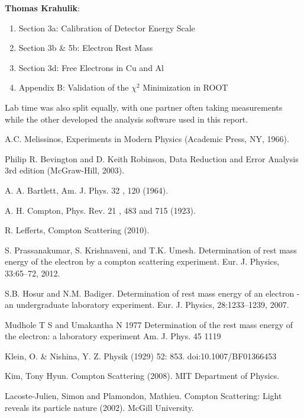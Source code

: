 \documentclass[%
 reprint,
 amsmath,amssymb,
 aps,
 pra,
]{revtex4-1}
\begin{document}
\noindent \textbf{Thomas Krahulik}:
\begin{enumerate}
	\item Section 3a: Calibration of Detector Energy Scale
	\item Section 3b \& 5b: Electron Rest Mass
	\item Section 3d: Free Electrons in Cu and Al
	\item Appendix B: Validation of the $\chi^2$ Minimization in ROOT
\end{enumerate}

\noindent Lab time was also split equally, with one partner often taking measurements while the other developed the analysis software used in this report.

\begin{thebibliography}{6}
	
	A.C. Melissinos, Experiments in Modern Physics (Academic Press, NY, 1966).
	
	Philip R. Bevington and D. Keith Robinson, Data Reduction and Error Analysis 3rd edition (McGraw-Hill, 2003).

	A. A. Bartlett, Am. J. Phys. 32 , 120 (1964).
	
	A. H. Compton, Phys. Rev. 21 , 483 and 715 (1923).
	
	R. Lefferts, Compton Scattering (2010).
	
	 S. Prassanakumar, S. Krishnaveni, and T.K. Umesh. Determination of rest mass energy of the electron by a compton scattering experiment. Eur. J. Physics, 33:65–72, 2012.
	 
	S.B. Hosur and N.M. Badiger. Determination of rest mass energy of an electron - an undergraduate laboratory experiment. Eur. J. Physics, 28:1233–1239, 2007.
	
	Mudhole T S and Umakantha N 1977 Determination of the rest mass energy of the electron: a laboratory experiment Am. J. Phys. 45 1119
	
	Klein, O. \& Nishina, Y. Z. Physik (1929) 52: 853. doi:10.1007/BF01366453
	
	Kim, Tony Hyun. Compton Scattering (2008). MIT Department of Physics.
	
	Lacoste-Julien, Simon and Plamondon, Mathieu. Compton Scattering: Light reveals its particle nature (2002). McGill University.
	

\end{thebibliography}
\end{document}
